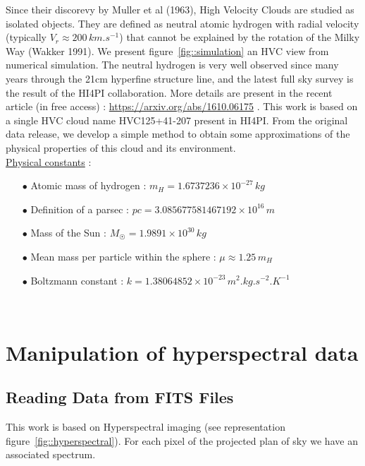 \documentclass[a4paper,10.5pt]{report}
\begin{document}
Since their discorevy by Muller et al (1963), High Velocity Clouds are studied as isolated objects. They are defined 
as neutral atomic hydrogen with radial velocity (typically $ V_r \approx 200 \, km.s^{-1}$) that cannot be explained by the rotation 
of the Milky Way (Wakker 1991). We present figure~\ref{fig::simulation} an HVC view from numerical simulation. 
The neutral hydrogen is very well observed since many years through the 21cm hyperfine structure line, and the latest full sky survey 
is the result of the HI4PI collaboration. More details are present in the recent article (in free access) : 
\color{blue} \url{https://arxiv.org/abs/1610.06175} \color{black}. 
This work is based on a single HVC cloud name HVC125+41-207 present in HI4PI. From the original data release, we develop a simple
method to obtain some approximations of the physical properties of this cloud and its environment. \\

\newpage 
\noindent
\underline{Physical constants} : \\
\begin{itemize}
\item[$\bullet$] Atomic mass of hydrogen : $m_H = 1.6737236 \times 10^{-27} \, kg$ 
\item[$\bullet$] Definition of a parsec : $pc = 3.085677581467192 \times 10^{16} \, m$
\item[$\bullet$] Mass of the Sun : $M_{\astrosun} = 1.9891 \times 10^{30} \, kg$
\item[$\bullet$] Mean mass per particle within the sphere : $\mu \approx 1.25 \, m_H$
\item[$\bullet$] Boltzmann constant : $k = 1.38064852 \times 10^{-23} \, m^2.kg.s^{-2}.K^{-1}$ 
\end{itemize} \\

\chapter{Manipulation of hyperspectral data}
\section{Reading Data from FITS Files}
This work is based on Hyperspectral imaging (see representation figure~\ref{fig::hyperspectral}). 
For each pixel of the projected plan of sky we have an associated spectrum. \\
\end{document}
